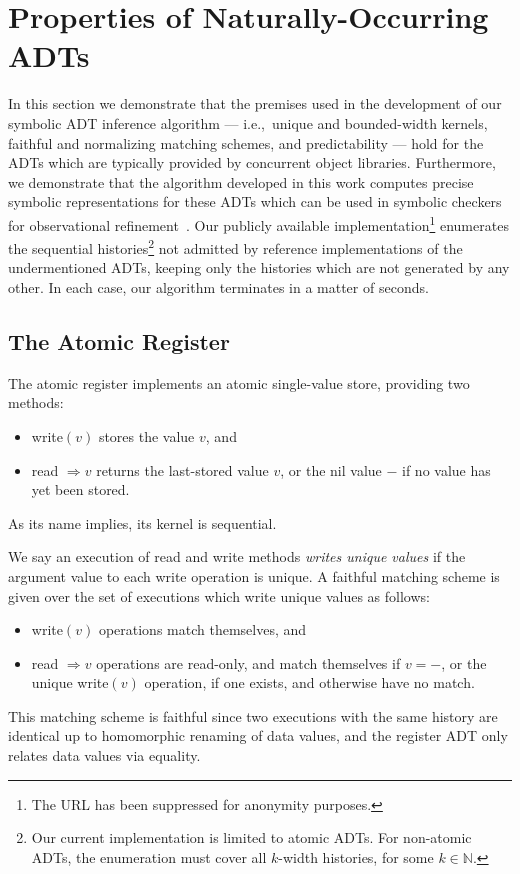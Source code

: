 \section{Properties of Naturally-Occurring ADTs}
\label{sec:nature}

In this section we demonstrate that the premises used in the development of our
symbolic ADT inference algorithm — i.e.,~unique and bounded-width kernels,
faithful and normalizing matching schemes, and predictability — hold for the
ADTs which are typically provided by concurrent object libraries. Furthermore,
we demonstrate that the algorithm developed in this work computes precise
symbolic representations for these ADTs which can be used in symbolic checkers
for observational refinement~\cite{conf/pldi/EmmiEH15}. Our publicly available
implementation\footnote{The URL has been suppressed for anonymity purposes.}
enumerates the sequential histories\footnote{Our current implementation is
limited to atomic ADTs. For non-atomic ADTs, the enumeration must cover all
$k$-width histories, for some $k \in \mathbb{N}$.} not admitted by reference
implementations of the undermentioned ADTs, keeping only the histories which
are not generated by any other. In each case, our algorithm terminates in a
matter of seconds.

\subsection{The Atomic Register}

The atomic register implements an atomic single-value store, providing two
methods:
\begin{itemize}

  \item write$(v)$ stores the value $v$, and

  \item read $\Rightarrow v$ returns the last-stored value $v$, or the nil
  value $-$ if no value has yet been stored.

\end{itemize}
As its name implies, its kernel is sequential.

We say an execution of read and write methods \emph{writes unique values} if
the argument value to each write operation is unique. A faithful matching
scheme is given over the set of executions which write unique values as follows:
\begin{itemize}

  \item write$(v)$ operations match themselves, and

  \item read $\Rightarrow v$ operations are read-only, and match themselves if
  $v = -$, or the unique write$(v)$ operation, if one exists, and otherwise 
  have no match.

\end{itemize}
This matching scheme is faithful since two executions with the same history
are identical up to homomorphic renaming of data values, and the register ADT
only relates data values via equality.

